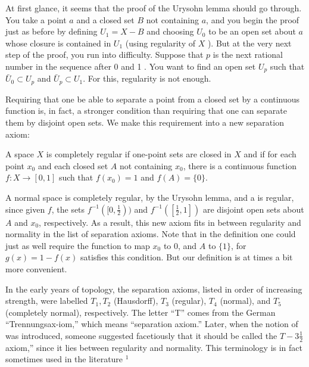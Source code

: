 At first glance, it seems that the proof of the Urysohn lemma should go through. You take a point \(a\) and a closed set \(B\) not containing \(a\), and you begin the proof just as before by defining \(U_{1} = X - B\) and choosing \(U_{0}\) to be an open set about \(a\) whose closure is contained in \(U_{1}\) (using regularity of \(X\) ). But at the very next step of the proof, you run into difficulty. Suppose that \(p\) is the next rational number in the sequence after 0 and 1 . You want to find an open set \(U_{p}\) such that \(\bar{U}_{0} \subset {U}_{p}\) and \(\bar{U}_{p} \subset {U}_{1}\). For this, regularity is not enough.

Requiring that one be able to separate a point from a closed set by a continuous function is, in fact, a stronger condition than requiring that one can separate them by disjoint open sets. We make this requirement into a new separation axiom:

\begin{definition}
 A space \(X\) is completely regular if one-point sets are closed in \(X\) and if for each point \(x_{0}\) and each closed set \(A\) not containing \(x_{0}\), there is a continuous function \(f : X \rightarrow [ {0,1}]\) such that \(f( x_{0}) = 1\) and \(f( A) = \{ 0\}\).
\end{definition}

A normal space is completely regular, by the Urysohn lemma, and a  is regular, since given \(f\), the sets \(f^{-1}( [ {0,\frac{1}{2}}) )\) and \(f^{-1}( [ {\frac{1}{2},1}] )\) are disjoint open sets about \(A\) and \(x_{0}\), respectively. As a result, this new axiom fits in between regularity and normality in the list of separation axioms. Note that in the definition one could just as well require the function to map \(x_{0}\) to 0, and \(A\) to \(\{ 1\}\), for \(g(x) = 1 - f(x)\) satisfies this condition. But our definition is at times a bit more convenient.

In the early years of topology, the separation axioms, listed in order of increasing strength, were labelled \(T_{1},T_{2}\) (Hausdorff), \(T_{3}\) (regular), \(T_{4}\) (normal), and \(T_{5}\) (completely normal), respectively. The letter ``T'' comes from the German ``Trennungsax-iom,'' which means ``separation axiom.'' Later, when the notion of  was introduced, someone suggested facetiously that it should be called the \(T - 3\frac{1}{2}\) axiom,'' since it lies between regularity and normality. This terminology is in fact sometimes used in the literature \({}^{1}\)

